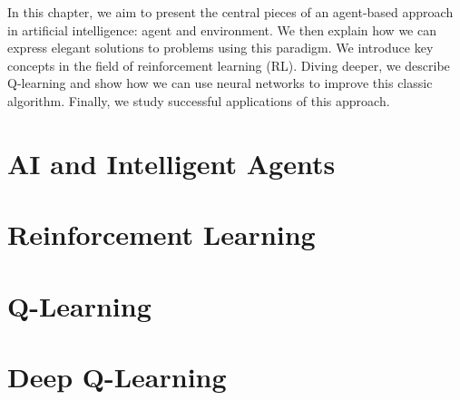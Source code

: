 In this chapter, we aim to present the central pieces of an agent-based approach in artificial intelligence: agent and environment.
We then explain how we can express elegant solutions to problems using this paradigm.
We introduce key concepts in the field of reinforcement learning (RL).
Diving deeper, we describe Q-learning and show how we can use neural networks to improve this classic algorithm.
Finally, we study successful applications of this approach.

\section{AI and Intelligent Agents}

\section{Reinforcement Learning}

\section{Q-Learning}


\section{Deep Q-Learning}


